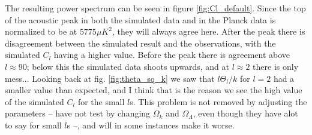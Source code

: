 \documentclass[a4paper,norsk, 10pt]{article}
\begin{document}
The resulting power spectrum can be seen in figure \ref{fig:Cl_default}. Since the top of the acoustic peak in both the simulated data and in the Planck data is normalized to be at $5775 \mu K^2$, they will always agree here. After the peak there is disagreement between the simulated result and the observations, with the simulated $C_l$ having a higher value. Before the peak there is agreement above $l \approx 90$; below this the simulated data shoots upwards, and at $l \approx 2$ there is only mess... Looking back at fig. \ref{fig:theta_sq_k} we saw that $l\Theta_l/k$ for $l=2$ had a smaller value than expected, and I think that is the reason we see the high value of the simulated $C_l$ for the small $l$s. This problem is not removed by adjusting the parameters -- have not test by changing $\Omega_k$ and $\Omega_{\Lambda}$, even though they have alot to say for small $l$s --, and will in some instances make it worse. 
\end{document}
